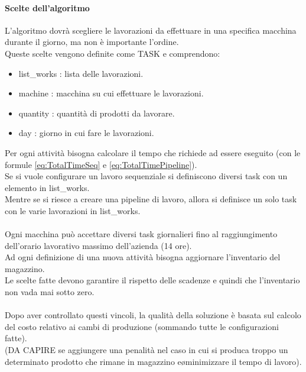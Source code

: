 \paragraph{Scelte dell'algoritmo}
L'algoritmo dovrà scegliere le lavorazioni da effettuare in una specifica macchina durante il giorno, ma non è importante l'ordine.\\
Queste scelte vengono definite come TASK e comprendono:
\begin{itemize}
    \item list\_works : lista delle lavorazioni.
    \item machine : macchina su cui effettuare le lavorazioni.
    \item quantity : quantità di prodotti da lavorare.
    \item day : giorno in cui fare le lavorazioni.
\end{itemize}
Per ogni attività bisogna calcolare il tempo che richiede ad essere eseguito (con le formule \ref{eq:TotalTimeSeq}  e \ref{eq:TotalTimePipeline}).\\
Se si vuole configurare un lavoro sequenziale si definiscono diversi task con un elemento in list\_works.\\
Mentre se si riesce a creare una pipeline di lavoro, allora si definisce un solo task con le varie lavorazioni in list\_works.
\\ \\
Ogni macchina può accettare diversi task giornalieri fino al raggiungimento dell'orario lavorativo massimo dell'azienda (14 ore).\\
Ad ogni definizione di una nuova attività bisogna aggiornare l'inventario del magazzino.\\
Le scelte fatte devono garantire il rispetto delle scadenze e quindi che l'inventario non vada mai sotto zero.
\\ \\
Dopo aver controllato questi vincoli, la qualità della soluzione è basata sul calcolo del costo relativo ai cambi di produzione (sommando tutte le configurazioni fatte).\\
(DA CAPIRE se aggiungere una penalità nel caso in cui si produca troppo un determinato prodotto che rimane in magazzino e\o minimizzare il tempo di lavoro).

